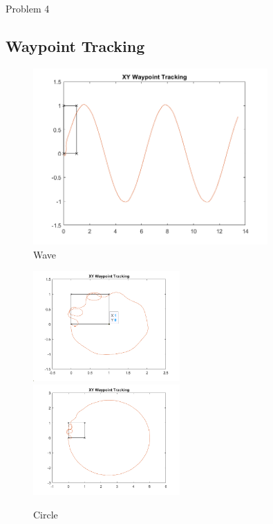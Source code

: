 \documentclass[answers]{exam}
\begin{document}
\begin{questions}
    \question Problem 4
    \subsection*{Waypoint Tracking}
    \begin{figure}[H]
        \centering
        \includegraphics[width=0.8\textwidth]{images/4-wave.png}
        \caption{Wave}
        \label{fig:my_label}
    \end{figure}

    \begin{figure}[H]
        \includegraphics[width=0.5\textwidth]{images/4-circle-r1.png}
        \includegraphics[width=0.5\textwidth]{images/4-circle-r2.5.png}
        \caption{Circle}
        \label{fig:my_label}
    \end{figure}

\end{questions}
\end{document}
